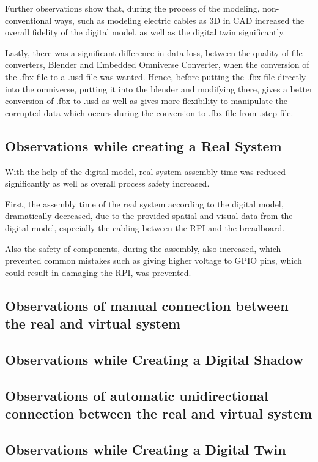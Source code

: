 \documentclass[conference]{IEEEtran}
\begin{document}
    Further observations show that, during the process of the modeling, non-conventional ways,
    such as modeling electric cables as 3D in CAD increased the overall fidelity of the digital model,
    as well as the digital twin significantly. 

    Lastly, there was a significant difference in data loss, between the quality of file converters, 
    Blender and Embedded Omniverse Converter, when the conversion of the .fbx file to a .usd file was wanted. 
    Hence, before putting the .fbx file directly into the omniverse, putting it into the blender and modifying
    there,  gives a better conversion of .fbx to .usd as well as gives more flexibility to manipulate the
    corrupted data which occurs during the conversion to .fbx file from .step file.

    \subsection*{Observations while creating a Real System}
    With the help of the digital model, real system assembly time was reduced 
    significantly as well as overall process safety increased.

    First, the assembly time of the real system according to the digital model, 
    dramatically decreased, due to the provided spatial and visual data from the digital model,
    especially the cabling between the RPI and the breadboard. 

    Also the safety of components, during the assembly, also increased, which prevented
    common mistakes such as giving higher voltage to 
    GPIO pins, which could result in damaging the RPI, was prevented. 

    \subsection*{Observations of manual connection between the real and virtual system}
    \subsection*{Observations while Creating a Digital Shadow}
    \subsection*{Observations of automatic unidirectional connection between the real and virtual system}
    \subsection*{Observations while Creating a Digital Twin}
\end{document}
